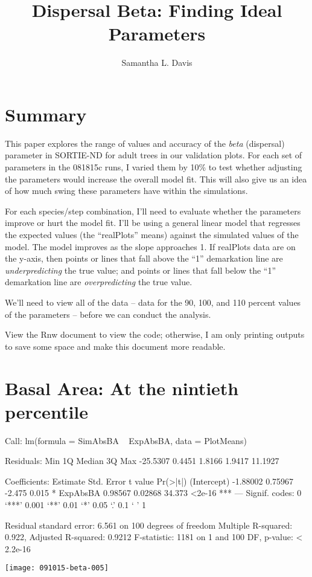 \documentclass{article}
\begin{document}


\title{Dispersal Beta: Finding Ideal Parameters}
\author{Samantha L. Davis}

\maketitle

\section{Summary}
This paper explores the range of values and accuracy of the \textit{beta} (dispersal) parameter in SORTIE-ND for adult trees in our validation plots. For each set of parameters in the 081815c runs, I varied them by 10\% to test whether adjusting the parameters would increase the overall model fit. This will also give us an idea of how much swing these parameters have within the simulations. 

For each species/step combination, I'll need to evaluate whether the parameters improve or hurt the model fit. I'll be using a general linear model that regresses the expected values (the ``realPlots'' means) against the simulated values of the model. The model improves as the slope approaches 1. If realPlots data are on the y-axis, then points or lines that fall above the ``1'' demarkation line are \textit{underpredicting} the true value; and points or lines that fall below the ``1'' demarkation line are \textit{overpredicting} the true value.

We'll need to view all of the data -- data for the 90, 100, and 110 percent values of the parameters -- before we can conduct the analysis. 

View the Rnw document to view the code; otherwise, I am only printing outputs to save some space and make this document more readable.







\newpage

\section{Basal Area: At the nintieth percentile}
\begin{Schunk}
\begin{Soutput}
Call:
lm(formula = SimAbsBA ~ ExpAbsBA, data = PlotMeans)

Residuals:
     Min       1Q   Median       3Q      Max 
-25.5307   0.4451   1.8166   1.9417  11.1927 

Coefficients:
            Estimate Std. Error t value Pr(>|t|)    
(Intercept) -1.88002    0.75967  -2.475    0.015 *  
ExpAbsBA     0.98567    0.02868  34.373   <2e-16 ***
---
Signif. codes:  0 ‘***’ 0.001 ‘**’ 0.01 ‘*’ 0.05 ‘.’ 0.1 ‘ ’ 1

Residual standard error: 6.561 on 100 degrees of freedom
Multiple R-squared:  0.922,	Adjusted R-squared:  0.9212 
F-statistic:  1181 on 1 and 100 DF,  p-value: < 2.2e-16
\end{Soutput}
\end{Schunk}
\texttt{[image: 091015-beta-005]}
\end{document}
